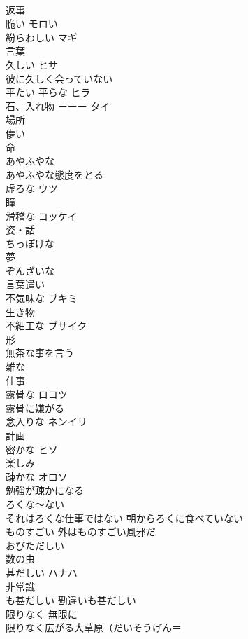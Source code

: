 \documentclass[8pt]{extreport}
\begin{document}
\begin{CJK}{UTF8}{min}
\\	返事
\\	脆い	モロい 
\\	紛らわしい	マギ 
\\	言葉
\\	久しい	ヒサ 
\\	彼に久しく会っていない
\\	平たい 平らな	ヒラ 
\\	石、入れ物 ーーー タイ 
\\	場所
\\	儚い	
\\	命
\\	あやふやな	
\\	あやふやな態度をとる 
\\	虚ろな	ウツ 
\\	瞳 
\\	滑稽な	コッケイ 
\\	姿・話
\\	ちっぽけな	
\\	夢
\\	ぞんざいな	
\\	言葉遣い
\\	不気味な	ブキミ 
\\	生き物
\\	不細工な	ブサイク 
\\	形　
\\	無茶な事を言う	
\\	雑な	
\\	仕事
\\	露骨な	ロコツ 
\\	露骨に嫌がる
\\	念入りな	ネンイリ 
\\	計画
\\	密かな	ヒソ 
\\	楽しみ
\\	疎かな	オロソ 
\\	勉強が疎かになる 
\\	ろくな〜ない	
\\	それはろくな仕事ではない 朝からろくに食べていない
\\	ものすごい	外はものすごい風邪だ
\\	おびただしい	
\\	数の虫
\\	甚だしい	ハナハ 
\\	非常識
\\	も甚だしい 勘違いも甚だしい 
\\	限りなく 無限に	
\\	限りなく広がる大草原（だいそうげん＝

\end{CJK}
\end{document}

